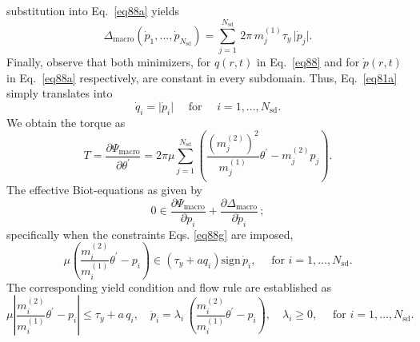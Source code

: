 \documentclass[final,1p,times]{elsarticle}
\newcommand{\be}{\begin{equation}}
\newcommand{\ee}{\end{equation}}
\newcommand{\sgcmt}[1]{{\color{red}[#1]}~}
\newcommand{\gjcmt}[1]{{\color{cyan}[#1]}~}
\begin{document}
substitution into Eq.\ \eqref{eq88a} yields
\be
\label{eq88f}
\Delta_\mathrm{macro}(\dot p_1,\ldots,\dot p_{N_\mathrm{sd}} ) 
= \sum_{j=1}^{N_\mathrm{sd}}\,2\pi \, m^{(1)}_j \tau_y \, \vert \dot p_j \vert.
\ee
Finally, observe that both minimizers, for $q(r,t)$ in Eq.\ \eqref{eq88} and for $\dot p(r,t)$ in Eq.\ \eqref{eq88a} respectively, are constant in every subdomain. Thus, Eq.\ \eqref{eq81a} simply translates into
\be
\label{eq88g}
\dot q_i = \vert \dot p_i \vert \quad\text{ for }\quad i = 1,\ldots,N_\mathrm{sd}.
\ee
We obtain the torque as
\be
\label{eq200}
T = \frac{\partial \Psi_\mathrm{macro}}{\partial \theta^\prime} = 2 \pi \mu \sum_{j=1}^{N_\mathrm{sd}}  
\left(\frac{(m^{(2)}_j)^2}{m^{(1)}_j} \theta^\prime- m^{(2)}_j p_j \right).
\ee
The effective Biot-equations as given by
\be
\label{eq201}
0 \in\frac{\partial \Psi_\mathrm{macro}}{\partial p_i}+\frac{\partial \Delta_\mathrm{macro}}{\partial \dot p_i}\,;
\ee
specifically when the constraints Eqs. \eqref{eq88g} are imposed,
\be
\label{eq202}
\mu \left(\frac{m^{(2)}_i}{m^{(1)}_i} \theta^\prime- p_i \right) \in \left( \tau_y + a q_i \right) \mathrm{sign} \, \dot p_i, \quad \text{ for } i = 1,\ldots,N_\mathrm{sd}.
\ee
The corresponding yield condition and flow rule are established as
\be
\label{eq203}
\mu \left|\frac{m^{(2)}_i}{m^{(1)}_i} \theta^\prime- p_i \right| \le \tau_y + a \, q_i, \quad \dot p_i = \lambda_i \, \left(\frac{m^{(2)}_i}{m^{(1)}_i} \theta^\prime- p_i \right), \quad \lambda_i \ge 0, \quad \text{ for } i = 1,\ldots,N_\mathrm{sd}.
\ee
 

 
\end{document}
